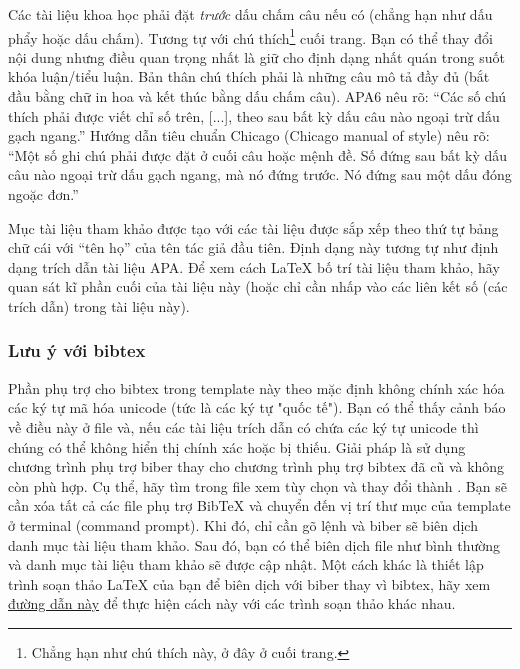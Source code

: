 Các tài liệu khoa học phải đặt \emph{trước} dấu chấm câu nếu có (chẳng hạn như dấu phẩy hoặc dấu chấm). Tương tự với chú thích\footnote{Chẳng hạn như chú thích này, ở đây ở cuối trang.} cuối trang. Bạn có thể thay đổi nội dung nhưng điều quan trọng nhất là giữ cho định dạng nhất quán trong suốt khóa luận/tiểu luận. Bản thân chú thích phải là những câu mô tả đầy đủ (bắt đầu bằng chữ in hoa và kết thúc bằng dấu chấm câu). APA6 nêu rõ: \enquote{Các số chú thích phải được viết chỉ số trên, [...], theo sau bất kỳ dấu câu nào ngoại trừ dấu gạch ngang.} Hướng dẫn tiêu chuẩn Chicago (Chicago manual of style) nêu rõ: \enquote {Một số ghi chú phải được đặt ở cuối câu hoặc mệnh đề. Số đứng sau bất kỳ dấu câu nào ngoại trừ dấu gạch ngang, mà nó đứng trước. Nó đứng sau một dấu đóng ngoặc đơn.}

Mục tài liệu tham khảo được tạo với các tài liệu được sắp xếp theo thứ tự bảng chữ cái với ``tên họ'' của tên tác giả đầu tiên. Định dạng này tương tự như định dạng trích dẫn tài liệu APA. Để xem cách \LaTeX{} bố trí tài liệu tham khảo, hãy quan sát kĩ phần cuối của tài liệu này (hoặc chỉ cần nhấp vào các liên kết số (các trích dẫn) trong tài liệu này).


\subsubsection{Lưu ý với bibtex}

Phần phụ trợ cho bibtex trong template này theo mặc định không chính xác hóa các ký tự mã hóa unicode (tức là các ký tự "quốc tế"). Bạn có thể thấy cảnh báo về điều này ở file  và, nếu các tài liệu trích dẫn có chứa các ký tự unicode thì chúng có thể không hiển thị chính xác hoặc bị thiếu. Giải pháp là sử dụng chương trình phụ trợ biber thay cho chương trình phụ trợ bibtex đã cũ và không còn phù hợp. Cụ thể, hãy tìm trong file  xem tùy chọn  và thay đổi thành . Bạn sẽ cần xóa tất cả các file phụ trợ BibTeX và chuyển đến vị trí thư mục của template ở terminal (command prompt). Khi đó, chỉ cần gõ lệnh  và biber sẽ biên dịch danh mục tài liệu tham khảo. Sau đó, bạn có thể biên dịch file  như bình thường và danh mục tài liệu tham khảo sẽ được cập nhật. Một cách khác là thiết lập trình soạn thảo LaTeX của bạn để biên dịch với biber thay vì bibtex, hãy xem \href{http://tex.stackexchange.com/questions/154751/biblatex-with-biber-configuring-my-editor-to-avoid-undefined-citations/}{đường dẫn này} để thực hiện cách này với các trình soạn thảo khác nhau.


